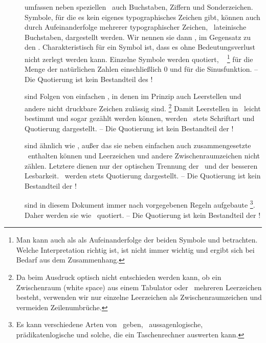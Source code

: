 \begin{description}
	\item[\Symbole] umfassen neben speziellen \Symbolen\ auch Buchstaben, Ziffern und Sonderzeichen.
	Symbole, für die es kein eigenes typographisches Zeichen gibt, können auch durch Aufeinanderfolge mehrerer typographischer Zeichen, \textiAlg\ lateinische Buchstaben, dargestellt werden.
	Wir nennen sie dann , im Gegensatz zu den .
	Charakteristisch für ein Symbol ist, dass es ohne Bedeutungsverlust nicht zerlegt werden kann.
	Einzelne Symbole werden  quotiert, \textzB\ \chrqt{$\gsNo$}%
	\footnote{%
		Man kann \chrqt{$\gsNo$} auch als als Aufeinanderfolge der beiden Symbole \chrqt{$\gsN$} und  betrachten.
		Welche Interpretation richtig ist, ist nicht immer wichtig und ergibt sich bei Bedarf aus dem Zusammenhang.
	}
	für die Menge der natürlichen Zahlen einschließlich 0 und \chrqt{$\sin$} für die Sinusfunktion.
	-- Die Quotierung ist kein Bestandteil des \Symbols!
	\item [\Zeichenketten] sind Folgen von einfachen \Symbolen, in denen im Prinzip auch Leerstellen und andere nicht druckbare Zeichen zulässig sind.%
	\footnote{%
		Da beim Ausdruck optisch nicht entschieden werden kann, ob ein Zwischenraum (white space) aus einem Tabulator oder \textevtl\ mehreren Leerzeichen besteht, verwenden wir nur einzelne Leerzeichen als Zwischenraumzeichen und vermeiden Zeilenumbrüche.
	}
	Damit Leerstellen in \Zeichenketten\ leicht bestimmt und sogar gezählt werden können,
	werden \Zeichenketten\ stets  Schriftart und Quotierung dargestellt.
	-- Die Quotierung ist kein Bestandteil der \Zeichenkette!
	\item [\Zeichenfolgen] sind ähnlich wie \Zeichenketten, außer das sie neben einfachen auch zusammengesetzte \Symbole\ enthalten können und Leerzeichen und andere Zwischenraumzeichen nicht zählen.
	Letztere dienen nur der optischen Trennung der \Symbole\ und der besseren Lesbarkeit.
	\Zeichenfolgen\ werden stets  Quotierung dargestellt.
	-- Die Quotierung ist kein Bestandteil der \Zeichenfolge!
	\item [\Formeln] sind in diesem Dokument immer nach vorgegebenen Regeln aufgebaute \Zeichenfolgen%
	\footnote{%
		Es kann verschiedene Arten von \Formeln\ geben, \textzB\ aussagenlogische, prädikatenlogische und solche, die ein Taschenrechner auswerten kann.
	}.
	Daher werden sie wie \Zeichenfolgen\ quotiert.
	-- Die Quotierung ist kein Bestandteil der \Zeichenfolge!


\end{description}
